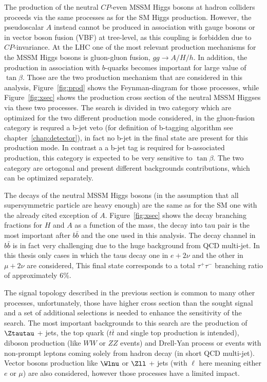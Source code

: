 The production of the neutral $CP$-even MSSM Higgs bosons at hadron
colliders proceeds via the same processes as for the SM Higgs
production. However, the pseudoscalar $A$ instead cannot be produced
in association with gauge bosons or in vector boson fusion (VBF) at
tree-level, as this coupling is forbidden due to $CP$-invariance.  At
the LHC one of the most relevant production mechanisms for the MSSM
Higgs bosons is gluon-gluon fusion, $gg\rightarrow A/H/h$. In
addition, the production in association with $b$-quarks becomes
important for large value of $\tan\beta$. Those are the two production mechanism
that are considered in this analysis, Figure~\ref{fig:prod} shows the Feynman-diagram
for those processes, while Figure~\ref{fig:xsec} shows the production cross section of the neutral 
MSSM Higgses via these two processes. The search is divided in two category which are optimized
for the two different production mode considered, in the gluon-fusion category
is requred a b-jet veto (for definition of b-tagging algorithm see chapter~\ref{chap:detector}), in fact no b-jet in the final state are present for this
production mode. In contrast a a b-jet tag is required for b-associated production,
this category is expected to be very sensitive to $\tan\beta$. The two category are
ortogonal and present different backgrounds contributions, which can be
optimized separately. 

The decays of the neutral
MSSM Higgs bosons (in the assumption that all supersymmetric particle
are heavy enough) are the same as for the SM one with the already
cited exception of $A$. Figure~\ref{fig:xsec} shows the decay branching fractions
for $H$ and $A$ as a function of the mass, 
the decay into tau pair is the most important after $b\bar{b}$ and the one used in this analysis. The 
decay channel in $b\bar{b}$ is in fact very challenging due to the huge background from
QCD multi-jet.
In this thesis only cases in which the taus decay one in $e + 2\nu$ and
the other in $\mu + 2\nu$ are considered, This final state corresponds to a total
$\tau^+\tau^-$ branching ratio of approximately 6\%.
 
The signal topology described in the previous section is common to many other processes, unfortunately, 
those have higher cross section than the sought signal and a set of additional selections
is needed to enhance the sensitivity of the search.
The most important backgrounds to this search are the production of
 $\Ztautau $ + jets, the top quark ($t\bar{t}$ and single top production is intended), diboson production 
(like $WW$ or $ZZ$ events) and Drell-Yan process or events with non-prompt leptons coming 
solely from hadron decay (in short QCD multi-jet).
Vector bosons production like  $\Wlnu$ or $\Zll$ + jets (with $\ell$ here meaning either $e$ or $\mu$) are also considered,
however those processes have a limited impact.

